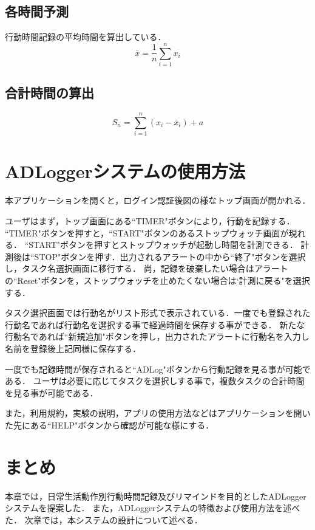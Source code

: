 \subsection{各時間予測}
行動時間記録の平均時間を算出している．
\[ \bar{x}=\frac{1}{n}\displaystyle\sum_{i=1}^{n}x_{i}\]

\subsection{合計時間の算出}
\[ S_n=\displaystyle\sum_{i=1}^{n} (x_{i}-\bar{x}_{i})+a\]



\section{ADLoggerシステムの使用方法}
本アプリケーションを開くと，ログイン認証後図の様なトップ画面が開かれる．%

ユーザはまず，トップ画面にある``TIMER"ボタンにより，行動を記録する．
``TIMER"ボタンを押すと，``START"ボタンのあるストップウォッチ画面が現れる．
``START"ボタンを押すとストップウォッチが起動し時間を計測できる．
計測後は``STOP"ボタンを押す．出力されるアラートの中から``終了"ボタンを選択し，タスク名選択画面に移行する．
尚，記録を破棄したい場合はアラートの``Reset"ボタンを，ストップウォッチを止めたくない場合は`計測に戻る"を選択する．

タスク選択画面では行動名がリスト形式で表示されている．一度でも登録された行動名であれば行動名を選択する事で経過時間を保存する事ができる．
新たな行動名であれば``新規追加"ボタンを押し，出力されたアラートに行動名を入力し名前を登録後上記同様に保存する．

一度でも記録時間が保存されると``ADLog"ボタンから行動記録を見る事が可能である．
ユーザは必要に応じてタスクを選択しする事で，複数タスクの合計時間を見る事が可能である．

また，利用規約，実験の説明，アプリの使用方法などはアプリケーションを開いた先にある``HELP"ボタンから確認が可能な様にする．


\section{まとめ}
本章では，日常生活動作別行動時間記録及びリマインドを目的としたADLoggerシステムを提案した．
また，ADLoggerシステムの特徴および使用方法を述べた．
次章では，本システムの設計について述べる．